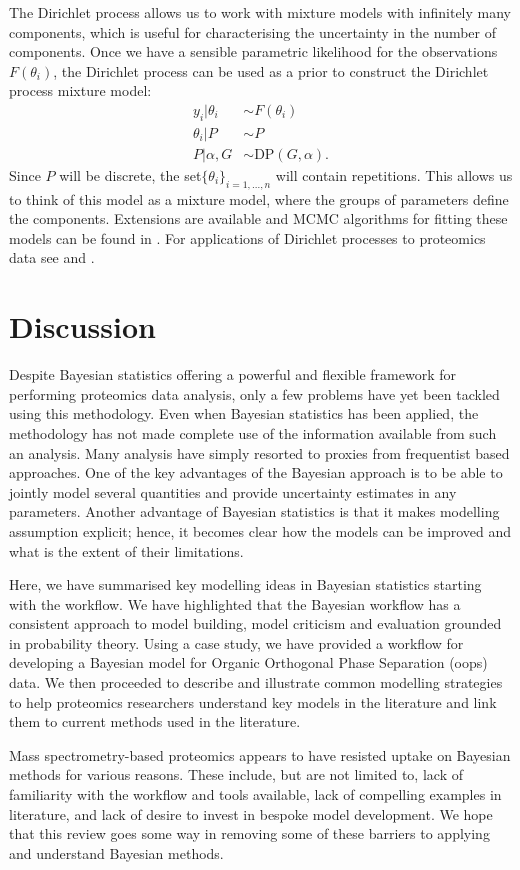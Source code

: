 \documentclass[12pt,english, journal=jpr, layout=twocolumn]{article}
\begin{document}
The Dirichlet process allows us to work with mixture models with infinitely many components, which is useful for characterising the uncertainty in the number of components. Once we have a sensible parametric likelihood for the observations $F(\theta_i)$, the Dirichlet process can be used as a prior to construct the Dirichlet process mixture model:
\begin{equation}
\begin{split}
y_i|\theta_i &\sim F(\theta_i)\\
\theta_i|P &\sim P \\
P|\alpha, G & \sim \text{DP}(G, \alpha).
\end{split}
\end{equation}
Since $P$ will be discrete, the set$\{\theta_i\}_{i = 1,...,n}$ will contain repetitions. This allows us to think of this model as a mixture model, where the groups of parameters define the components. Extensions are available \citep{Teh::2006, Rodriguez::2008} and MCMC algorithms for fitting these models can be found in \citet{Neal::2000}. For applications of Dirichlet processes to proteomics data see \citet{Claassen::2009} and \citet{Choi::2010}.

\section{Discussion}
Despite Bayesian statistics offering a powerful and flexible framework for performing proteomics data analysis, only a few problems have yet been tackled using this methodology. Even when Bayesian statistics has been applied, the methodology has not made complete use of the information available from such an analysis. Many analysis have simply resorted to proxies from frequentist based approaches. One of the key advantages of the Bayesian approach is to be able to jointly model several quantities and provide uncertainty estimates in any parameters. Another advantage of Bayesian statistics is that it makes modelling assumption explicit; hence, it becomes clear how the models can be improved and what is the extent of their limitations.

Here, we have summarised key modelling ideas in Bayesian statistics starting with the workflow. We have highlighted that the Bayesian workflow has a consistent approach to model building, model criticism and evaluation grounded in probability theory. Using a case study, we have provided a workflow for developing a Bayesian model for Organic Orthogonal Phase Separation (oops) data. We then proceeded to describe and illustrate common modelling strategies to help proteomics researchers understand key models in the literature and link them to current methods used in the literature.

Mass spectrometry-based proteomics appears to have resisted uptake on Bayesian methods for various reasons. These include, but are not limited to, lack of familiarity with the workflow and tools available, lack of compelling examples in literature, and lack of desire to invest in bespoke model development. We hope that this review goes some way in removing some of these barriers to applying and understand Bayesian methods. 
	

	
\end{document}
